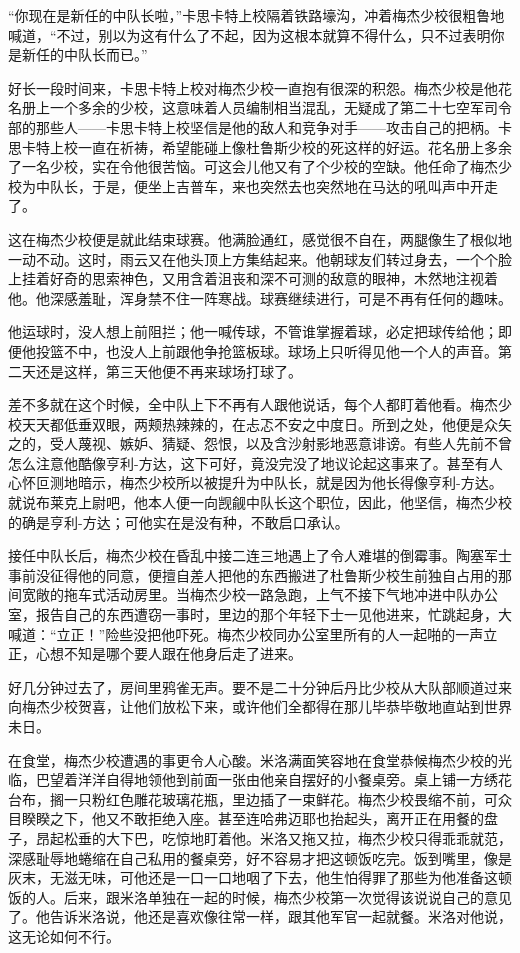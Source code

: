     “你现在是新任的中队长啦，”卡思卡特上校隔着铁路壕沟，冲着梅杰少校很粗鲁地喊道，“不过，别以为这有什么了不起，因为这根本就算不得什么，只不过表明你是新任的中队长而已。”

    好长一段时间来，卡思卡特上校对梅杰少校一直抱有很深的积怨。梅杰少校是他花名册上一个多余的少校，这意味着人员编制相当混乱，无疑成了第二十七空军司令部的那些人——卡思卡特上校坚信是他的敌人和竞争对手——攻击自己的把柄。卡思卡特上校一直在祈祷，希望能碰上像杜鲁斯少校的死这样的好运。花名册上多余了一名少校，实在令他很苦恼。可这会儿他又有了个少校的空缺。他任命了梅杰少校为中队长，于是，便坐上吉普车，来也突然去也突然地在马达的吼叫声中开走了。

    这在梅杰少校便是就此结束球赛。他满脸通红，感觉很不自在，两腿像生了根似地一动不动。这时，雨云又在他头顶上方集结起来。他朝球友们转过身去，一个个脸上挂着好奇的思索神色，又用含着沮丧和深不可测的敌意的眼神，木然地注视着他。他深感羞耻，浑身禁不住一阵寒战。球赛继续进行，可是不再有任何的趣味。

    他运球时，没人想上前阻拦；他一喊传球，不管谁掌握着球，必定把球传给他；即便他投篮不中，也没人上前跟他争抢篮板球。球场上只听得见他一个人的声音。第二天还是这样，第三天他便不再来球场打球了。

    差不多就在这个时候，全中队上下不再有人跟他说话，每个人都盯着他看。梅杰少校天天都低垂双眼，两颊热辣辣的，在忐忑不安之中度日。所到之处，他便是众矢之的，受人蔑视、嫉妒、猜疑、怨恨，以及含沙射影地恶意诽谤。有些人先前不曾怎么注意他酷像亨利-方达，这下可好，竟没完没了地议论起这事来了。甚至有人心怀叵测地暗示，梅杰少校所以被提升为中队长，就是因为他长得像亨利-方达。就说布莱克上尉吧，他本人便一向觊觎中队长这个职位，因此，他坚信，梅杰少校的确是亨利-方达；可他实在是没有种，不敢启口承认。

    接任中队长后，梅杰少校在昏乱中接二连三地遇上了令人难堪的倒霉事。陶塞军士事前没征得他的同意，便擅自差人把他的东西搬进了杜鲁斯少校生前独自占用的那间宽敞的拖车式活动房里。当梅杰少校一路急跑，上气不接下气地冲进中队办公室，报告自己的东西遭窃一事时，里边的那个年轻下士一见他进来，忙跳起身，大喊道：“立正！”险些没把他吓死。梅杰少校同办公室里所有的人一起啪的一声立正，心想不知是哪个要人跟在他身后走了进来。

    好几分钟过去了，房间里鸦雀无声。要不是二十分钟后丹比少校从大队部顺道过来向梅杰少校贺喜，让他们放松下来，或许他们全都得在那儿毕恭毕敬地直站到世界未日。

    在食堂，梅杰少校遭遇的事更令人心酸。米洛满面笑容地在食堂恭候梅杰少校的光临，巴望着洋洋自得地领他到前面一张由他亲自摆好的小餐桌旁。桌上铺一方绣花台布，搁一只粉红色雕花玻璃花瓶，里边插了一束鲜花。梅杰少校畏缩不前，可众目睽睽之下，他又不敢拒绝入座。甚至连哈弗迈耶也抬起头，离开正在用餐的盘子，昂起松垂的大下巴，吃惊地盯着他。米洛又拖又拉，梅杰少校只得乖乖就范，深感耻辱地蜷缩在自己私用的餐桌旁，好不容易才把这顿饭吃完。饭到嘴里，像是灰末，无滋无味，可他还是一口一口地咽了下去，他生怕得罪了那些为他准备这顿饭的人。后来，跟米洛单独在一起的时候，梅杰少校第一次觉得该说说自己的意见了。他告诉米洛说，他还是喜欢像往常一样，跟其他军官一起就餐。米洛对他说，这无论如何不行。

